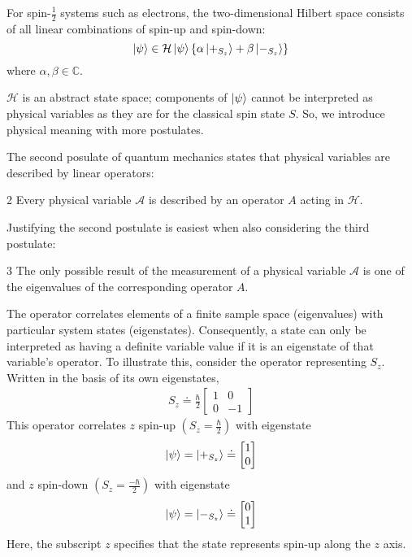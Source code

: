 For spin-$\frac{1}{2}$ systems such as electrons, the two-dimensional Hilbert space consists of all linear combinations of spin-up and spin-down:
\begin{equation}
  \ket{\psi} \in \mathcal{H} \\ \nonumber
  \ket{\psi}\{\alpha\ket{+_{S_z}} + \beta\ket{-_{S_z}}\}
\end{equation}
where $\alpha, \beta \in \mathbb{C}$.

$\mathcal{H}$ is an abstract state space; components of $\ket{\psi}$ cannot be interpreted as physical variables as they are for the classical spin state $S$. So, we introduce physical meaning with more postulates.

The second posulate of quantum mechanics states that physical variables are described by linear operators:
\begin{Thm:Postulate}{2}
    Every physical variable $\mathcal{A}$ is described by an operator $A$ acting in $\mathcal{H}$.
\end{Thm:Postulate}

Justifying the second postulate is easiest when also considering the third postulate:
\begin{Thm:Postulate}{3}
    The only possible result of the measurement of a physical variable $\mathcal{A}$ is one of the eigenvalues of the corresponding operator $A$.
\end{Thm:Postulate}

The operator correlates elements of a finite sample space (eigenvalues) with particular system states (eigenstates). Consequently, a state can only be interpreted as having a definite variable value if it is an eigenstate of that variable's operator. To illustrate this, consider the operator representing $S_z$. Written in the basis of its own eigenstates,
\begin{align}
    S_z \doteq \frac{\hbar}{2}\begin{bmatrix} 1 & 0 \\ 0 & -1 \end{bmatrix}
\end{align}
This operator correlates $z$ spin-up $\left(S_z = \frac{\hbar}{2}\right)$ with eigenstate
\begin{align}
    \ket{\psi} = \ket{+_{S_z}} \doteq \begin{bmatrix} 1 \\ 0 \end{bmatrix}
\end{align}
and $z$ spin-down $\left(S_z = \frac{-\hbar}{2}\right)$ with eigenstate
\begin{align}
    \ket{\psi} = \ket{-_{S_z}} \doteq \begin{bmatrix} 0 \\ 1 \end{bmatrix}
\end{align}
Here, the subscript $z$ specifies that the state represents spin-up along the $z$ axis.

